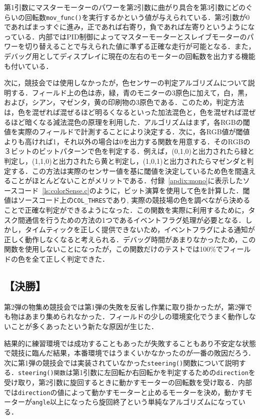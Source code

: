 \begin{multicols*}{2}
第1引数にマスターモーターのパワーを第2引数に曲がり具合を第3引数にどのぐらいの回転数\texttt{mov\_func()}を実行するかという値が与えられている．第2引数が0であればまっすぐに進み，正であれば右寄り，負であれば左寄りというようになっている．内部ではPID制御によってマスターモーターとスレイブモーターのパワーを切り替えることで与えられた値に準ずる正確な走行が可能となる．また，デバッグ用としてディスプレイに現在の左右のモーターの回転数を出力する機能も付いている． 

次に，競技会では使用しなかったが，色センサーの判定アルゴリズムについて説明する．フィールド上の色は赤，緑，青のモニターの3原色に加えて，白，黒，および，シアン，マゼンタ，黄の印刷物の3原色である．このため，判定方法は，色を混ぜれば混ぜるほど明るくなるといった加法混色と，色を混ぜれば混ぜるほど暗くなる減法混色の原理を利用した．アルゴリズムはまず，各RGBの閾値を実際のフィールドで計測することにより決定する．次に，各RGB値が閾値よりも高ければ1，それ以外の場合は0を出力する関数を用意する．そのRGBの３ビットのビットパターンで色を判定する．例えば，(0,1,0)と出力されたら緑と判定し，(1,1,0)と出力されたら黄と判定し，(1,0,1)と出力されたらマゼンダと判定する．この方法は実際のセンサー値を基に閾値を決定しているため色を間違えることがほとんどないことがメリットである．付録~\ref{apdix:mono}に表示したソースコード~\ref{ls:colorSense.c}のように，ビット演算を使用して色を計算した．閾値はソースコード上の\texttt{COL\_THRES}であり, 実際の競技場の色を調べながら決めることで正確な判定ができるようになった．この関数を実際に利用するために，タスク間通信を行うための方法の1つであるイベントフラグ処理が必要となる．しかし，タイムティックを正しく提供できないため，イベントフラグによる通知が正しく動作しなくなると考えられる．デバッグ時間があまりなかったため，この関数を使用しないことになったが，この関数だけのテストでは100\%でフィールドの色を全て正しく判定できた．

\subsection*{【決勝】}%
第2弾の物集め競技会では第1弾の失敗を反省し作業に取り掛かったが，第2弾でも物はあまり集められなかった．フィールドの少しの環境変化でうまく動作しないことが多くあったという新たな原因が生じた．

結果的に練習環境では成功することもあったが失敗することもあり不安定な状態で競技に臨んだ結果，本番環境ではうまくいかなかったのが一番の敗因だろう．次に第1弾の競技会では実装されていなかった\texttt{steering()}関数について説明する．\texttt{steering()関数}は第1引数に左回転か右回転かを判定するための\texttt{direction}を受け取り，第2引数に旋回するときに動かすモーターの回転数を受け取る．内部では\texttt{direction}の値によって動かすモーターと止めるモーターを決め，動かすモーターが\texttt{angle}以上になったら旋回終了という単純なアルゴリズムになっている．


\end{multicols*}
